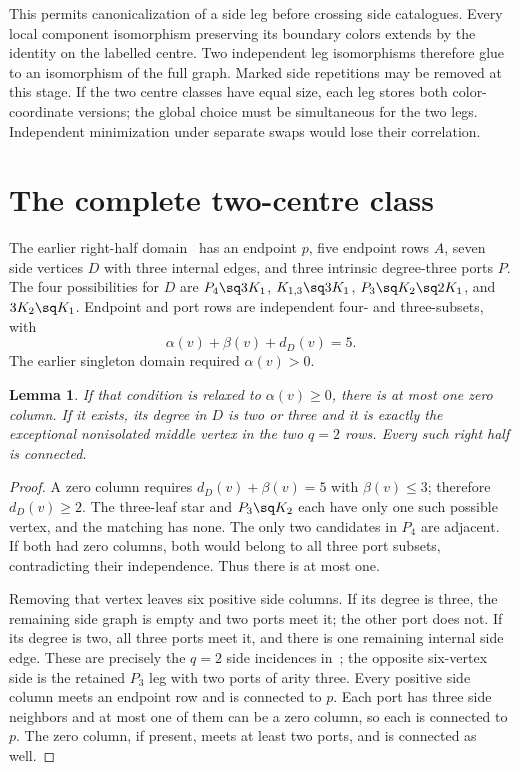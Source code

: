 \documentclass[11pt]{article}
\newtheorem{lemma}[theorem]{Lemma}
\begin{document}
This permits canonicalization of a side leg before crossing side
catalogues. Every local component isomorphism preserving its boundary
colors extends by the identity on the labelled centre. Two independent
leg isomorphisms therefore glue to an isomorphism of the full graph.
Marked side repetitions may be removed at this stage. If the two centre
classes have equal size, each leg stores both color-coordinate versions;
the global choice must be simultaneous for the two legs. Independent
minimization under separate swaps would lose their correlation.

\section{The complete two-centre class}

The earlier right-half domain~\cite{right} has an endpoint $p$, five
endpoint rows $A$, seven side vertices $D$ with three internal edges,
and three intrinsic degree-three ports $P$. The four possibilities for
$D$ are $P_4\sq3K_1$, $K_{1,3}\sq3K_1$,
$P_3\sq K_2\sq2K_1$, and $3K_2\sq K_1$.
Endpoint and port rows are independent four- and three-subsets, with
\[
 \alpha(v)+\beta(v)+d_D(v)=5.
\]
The earlier singleton domain required $\alpha(v)>0$.

\begin{lemma}\label{zero}
If that condition is relaxed to $\alpha(v)\geq0$, there is at most one
zero column. If it exists, its degree in $D$ is two or three and it is
exactly the exceptional nonisolated middle vertex in the two $q=2$ rows.
Every such right half is connected.
\end{lemma}
\begin{proof}
A zero column requires $d_D(v)+\beta(v)=5$ with $\beta(v)\leq3$;
therefore $d_D(v)\geq2$. The three-leaf star and $P_3\sq K_2$ each
have only one such possible vertex, and the matching has none. The only
two candidates in $P_4$ are adjacent. If both had zero columns, both
would belong to all three port subsets, contradicting their independence.
Thus there is at most one.

Removing that vertex leaves six positive side columns. If its degree
is three, the remaining side graph is empty and two ports meet it;
the other port does not. If its degree is two, all three ports meet
it, and there is one remaining internal side edge. These are precisely
the $q=2$ side incidences in~\cite{rows}; the opposite six-vertex side
is the retained $P_3$ leg with two ports of arity three. Every positive
side column meets an endpoint row and is connected to $p$. Each port
has three side neighbors and at most one of them can be a zero column,
so each is connected to $p$. The zero column, if present, meets at least
two ports, and is connected as well.
\end{proof}
\end{document}
